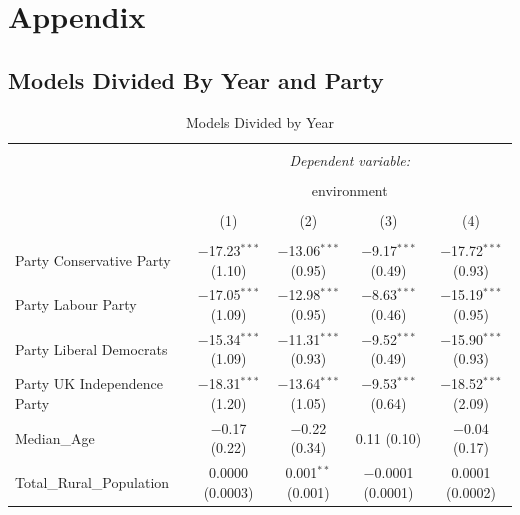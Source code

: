 \documentclass[12pt,letterpaper]{article}
\begin{document}
 



\newpage


\section{Appendix}

\subsection{ Models Divided By Year and Party}



\begin{table}[!htbp] \centering 
	\caption{Models Divided by Year} 
	\label{} 
	\footnotesize 
	\begin{adjustbox}{width=\textwidth}
		\begin{tabular}{@{\extracolsep{5pt}}lcccc} 
			\\[-1.8ex]\hline 
			\hline \\[-1.8ex] 
			& \multicolumn{4}{c}{\textit{Dependent variable:}} \\ 
			\cline{2-5} 
			\\[-1.8ex] & \multicolumn{4}{c}{environment} \\ 
			\\[-1.8ex] & (1) & (2) & (3) & (4)\\ 
			\hline \\[-1.8ex] 
			Party Conservative Party & $-$17.23$^{***}$ (1.10) & $-$13.06$^{***}$ (0.95) & $-$9.17$^{***}$ (0.49) & $-$17.72$^{***}$ (0.93) \\ 
			Party Labour Party & $-$17.05$^{***}$ (1.09) & $-$12.98$^{***}$ (0.95) & $-$8.63$^{***}$ (0.46) & $-$15.19$^{***}$ (0.95) \\ 
			Party Liberal Democrats & $-$15.34$^{***}$ (1.09) & $-$11.31$^{***}$ (0.93) & $-$9.52$^{***}$ (0.49) & $-$15.90$^{***}$ (0.93) \\ 
			Party UK Independence Party & $-$18.31$^{***}$ (1.20) & $-$13.64$^{***}$ (1.05) & $-$9.53$^{***}$ (0.64) & $-$18.52$^{***}$ (2.09) \\ 
			Median\_Age & $-$0.17 (0.22) & $-$0.22 (0.34) & 0.11 (0.10) & $-$0.04 (0.17) \\ 
			Total\_Rural\_Population & 0.0000 (0.0003) & 0.001$^{**}$ (0.001) & $-$0.0001 (0.0001) & 0.0001 (0.0002) \\ 

\end{tabular}
\end{adjustbox}
\end{table}
\end{document}

